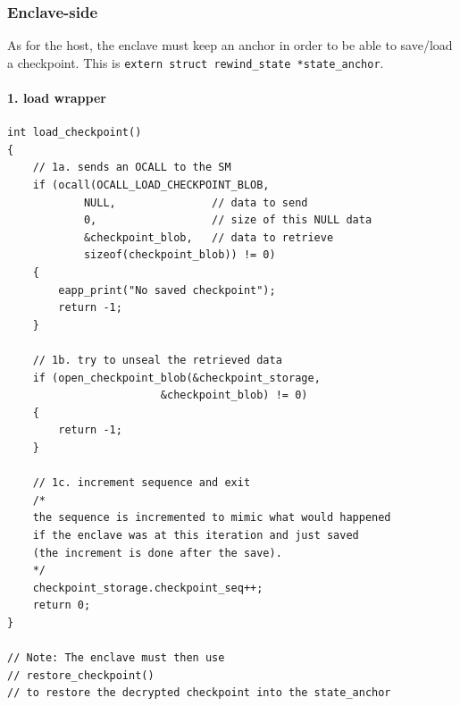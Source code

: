 \documentclass[11pt,a4paper]{report}
\begin{document}
\subsubsection{Enclave-side}
As for the host, the enclave must keep an anchor in order to be able to save/load a checkpoint.
This is \verb|extern struct rewind_state *state_anchor|.

\paragraph{1. load wrapper}
\begin{verbatim}
int load_checkpoint() 
{   
    // 1a. sends an OCALL to the SM
    if (ocall(OCALL_LOAD_CHECKPOINT_BLOB, 
            NULL,               // data to send
            0,                  // size of this NULL data
            &checkpoint_blob,   // data to retrieve
            sizeof(checkpoint_blob)) != 0)
    {
        eapp_print("No saved checkpoint");
        return -1;
    }

    // 1b. try to unseal the retrieved data
    if (open_checkpoint_blob(&checkpoint_storage, 
                        &checkpoint_blob) != 0)
    {
        return -1;
    }

    // 1c. increment sequence and exit
    /* 
    the sequence is incremented to mimic what would happened
    if the enclave was at this iteration and just saved
    (the increment is done after the save).
    */ 
    checkpoint_storage.checkpoint_seq++; 
    return 0;
}

// Note: The enclave must then use
// restore_checkpoint() 
// to restore the decrypted checkpoint into the state_anchor
\end{verbatim}
\end{document}
